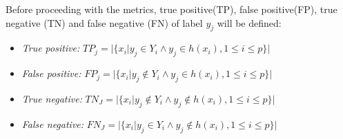 \documentclass[12pt]{report}
\begin{document}
    Before proceeding with the metrics, true positive(TP), false positive(FP),
    true negative (TN) and false negative (FN) of label $y_j$ will be defined:
		\begin{itemize}
			\item \emph{True positive: } $TP_j = |\{x_i | y_j \in Y_i \wedge y_j \in h(x_i), 1 \leq i \leq p \}|$
			\item \emph{False positive: }$FP_j = |\{x_i | y_j \notin Y_i \wedge y_j \in h(x_i), 1 \leq i \leq p \}|$
			\item \emph{True negative: }$TN_J = |\{x_i | y_j \notin Y_i \wedge y_j \notin h(x_i), 1 \leq i \leq p \}|$
			\item \emph{False negative: }$FN_J = |\{x_i | y_j \in Y_i \wedge y_j \notin h(x_i), 1 \leq i \leq p \}|$
		\end{itemize}
\end{document}
